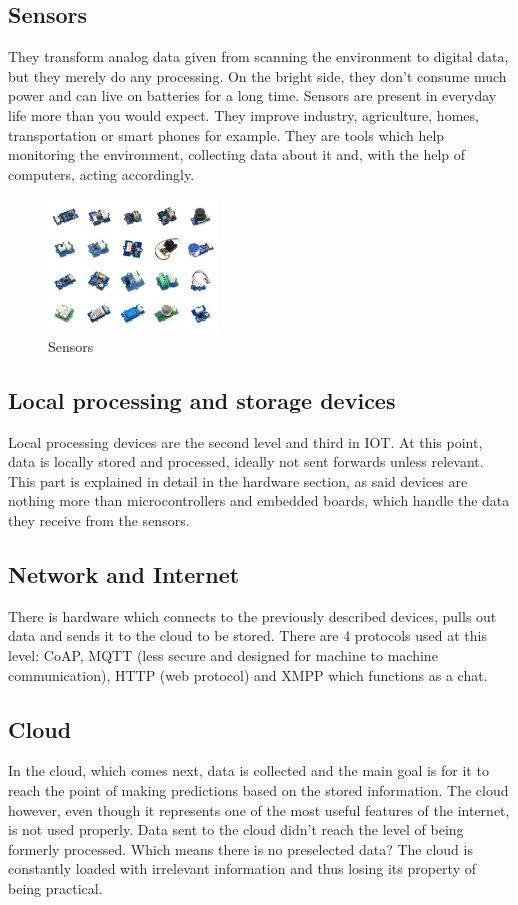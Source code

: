 \subsection{Sensors}
They transform analog data given from scanning the environment to digital data, but they merely do any processing. On the bright side, they don't consume much power and can live on batteries for a long time. Sensors are present in everyday life more than you would expect.  
They improve industry, agriculture, homes, transportation or smart phones for example. They are tools which help monitoring the environment, collecting data about it and, with the help of computers, acting accordingly. 

\begin{figure}[ht]
    \centering
    \includegraphics[width=0.4\textwidth]{figures/Sensors.jpg}
    \caption{Sensors}
\end{figure}

\subsection{Local processing and storage devices}
 Local processing devices are the second level and third in IOT. At this point, data is locally stored and processed, ideally not sent forwards unless relevant. This part is explained in detail in the hardware section, as said devices are nothing more than microcontrollers and embedded boards, which handle the data they receive from the sensors.  
 
\subsection{Network and Internet}
There is hardware which connects to the previously described devices, pulls out data and sends it to the cloud to be stored. There are 4 protocols used at this level: CoAP, MQTT (less secure and designed for machine to machine communication), HTTP (web protocol) and XMPP which functions as a chat.

\subsection{Cloud} 
In the cloud, which comes next, data is collected and the main goal is for it to reach the point of making predictions based on the stored information. The cloud however, even though it represents one of the most useful features of the internet, is not used properly. Data sent to the cloud didn't reach the level of being formerly processed. Which means there is no preselected data? The cloud is constantly loaded with irrelevant information and thus losing its property of being practical.


